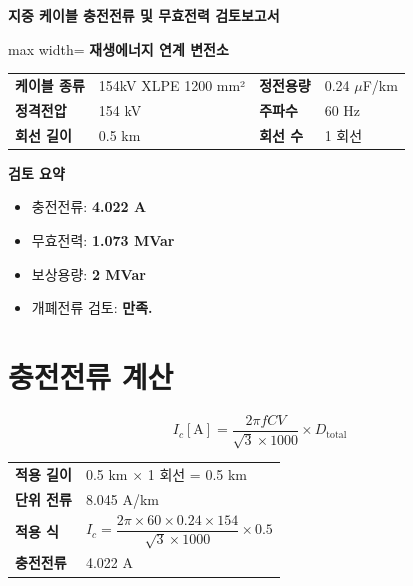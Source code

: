 \documentclass[11pt,a4paper]{article}
\begin{document}
\begin{tcolorbox}[
  colback=brandnavy,
  colframe=brandnavy,
  arc=4mm,
  boxrule=0pt,
  left=6mm,
  right=6mm,
  top=5mm,
  bottom=5mm
]
{\color{white}\fontsize{20}{24}\selectfont\bfseries 지중 케이블 충전전류 및 무효전력 검토보고서}

\vspace{4mm}
\begin{adjustbox}{max width=\textwidth}
{\color{white}\large\bfseries 재생에너지 연계 변전소}
\end{adjustbox}
\end{tcolorbox}

\begin{tabularx}{\textwidth}{>{\bfseries}p{30mm}X>{\bfseries}p{28mm}X}
케이블 종류 & 154kV XLPE 1200 mm² & 정전용량 & 0.24 $\mu$F/km \\
정격전압 & 154 kV & 주파수 & 60 Hz \\
회선 길이 & 0.5 km & 회선 수 & 1 회선 \\
\end{tabularx}

\vspace{4mm}

\begin{summarybox}
\textbf{검토 요약}
\begin{itemize}[leftmargin=6mm, itemsep=2pt, topsep=4pt]
\item 충전전류: \textbf{4.022 A}
\item 무효전력: \textbf{1.073 MVar}
\item 보상용량: \textbf{2 MVar}
\item 개폐전류 검토: \textbf{만족.}
\end{itemize}
\end{summarybox}

\section{충전전류 계산}

\[
I_c[\mathrm{A}] =
\frac{2\pi f C V}{\sqrt{3}\times 1000}
\times D_{\mathrm{total}}
\]

\begin{tabularx}{\textwidth}{>{\bfseries}p{45mm}X}
적용 길이 & 0.5 km $\times$ 1 회선 = 0.5 km \\
단위 전류 & 8.045 A/km \\
적용 식 & $I_c = \dfrac{2\pi \times 60 \times 0.24 \times 154}{\sqrt{3}\times 1000} \times 0.5$ \\
충전전류 & 4.022 A \\
\end{tabularx}
\end{document}
